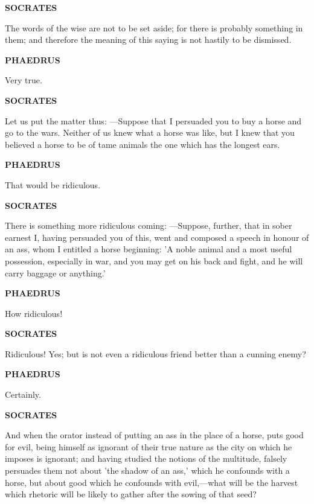 \documentclass[11pt,letter]{article}
\begin{document}
\par \textbf{SOCRATES}
\par   The words of the wise are not to be set aside; for there is probably something in them; and therefore the meaning of this saying is not hastily to be dismissed.

\par \textbf{PHAEDRUS}
\par   Very true.

\par \textbf{SOCRATES}
\par   Let us put the matter thus: —Suppose that I persuaded you to buy a horse and go to the wars. Neither of us knew what a horse was like, but I knew that you believed a horse to be of tame animals the one which has the longest ears.

\par \textbf{PHAEDRUS}
\par   That would be ridiculous.

\par \textbf{SOCRATES}
\par   There is something more ridiculous coming: —Suppose, further, that in sober earnest I, having persuaded you of this, went and composed a speech in honour of an ass, whom I entitled a horse beginning:  'A noble animal and a most useful possession, especially in war, and you may get on his back and fight, and he will carry baggage or anything.'

\par \textbf{PHAEDRUS}
\par   How ridiculous!

\par \textbf{SOCRATES}
\par   Ridiculous! Yes; but is not even a ridiculous friend better than a cunning enemy?

\par \textbf{PHAEDRUS}
\par   Certainly.

\par \textbf{SOCRATES}
\par   And when the orator instead of putting an ass in the place of a horse, puts good for evil, being himself as ignorant of their true nature as the city on which he imposes is ignorant; and having studied the notions of the multitude, falsely persuades them not about 'the shadow of an ass,' which he confounds with a horse, but about good which he confounds with evil,—what will be the harvest which rhetoric will be likely to gather after the sowing of that seed?
\end{document}
